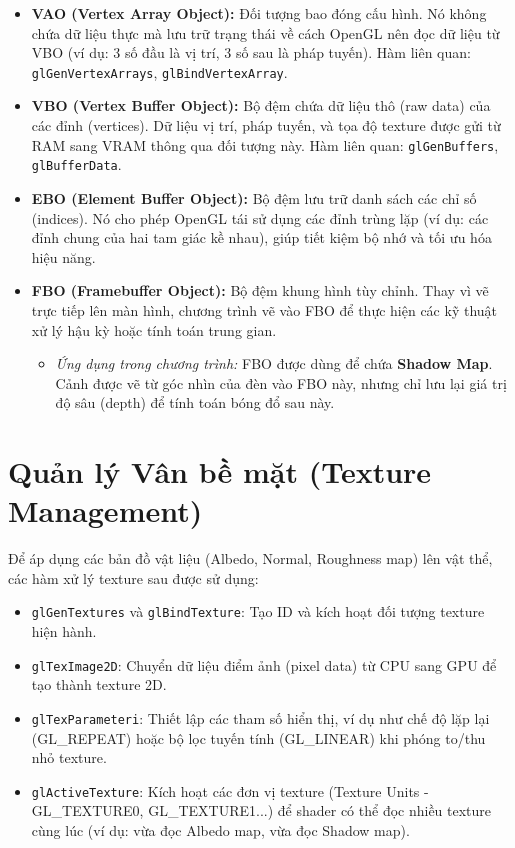 \begin{itemize}
	\item \textbf{VAO (Vertex Array Object):} Đối tượng bao đóng cấu hình. Nó không chứa dữ liệu thực mà lưu trữ trạng thái về cách OpenGL nên đọc dữ liệu từ VBO (ví dụ: 3 số đầu là vị trí, 3 số sau là pháp tuyến). Hàm liên quan: \texttt{glGenVertexArrays}, \texttt{glBindVertexArray}.
	\item \textbf{VBO (Vertex Buffer Object):} Bộ đệm chứa dữ liệu thô (raw data) của các đỉnh (vertices). Dữ liệu vị trí, pháp tuyến, và tọa độ texture được gửi từ RAM sang VRAM thông qua đối tượng này. Hàm liên quan: \texttt{glGenBuffers}, \texttt{glBufferData}.
	\item \textbf{EBO (Element Buffer Object):} Bộ đệm lưu trữ danh sách các chỉ số (indices). Nó cho phép OpenGL tái sử dụng các đỉnh trùng lặp (ví dụ: các đỉnh chung của hai tam giác kề nhau), giúp tiết kiệm bộ nhớ và tối ưu hóa hiệu năng.
	\item \textbf{FBO (Framebuffer Object):} Bộ đệm khung hình tùy chỉnh. Thay vì vẽ trực tiếp lên màn hình, chương trình vẽ vào FBO để thực hiện các kỹ thuật xử lý hậu kỳ hoặc tính toán trung gian.
	\begin{itemize}
		\item \textit{Ứng dụng trong chương trình:} FBO được dùng để chứa \textbf{Shadow Map}. Cảnh được vẽ từ góc nhìn của đèn vào FBO này, nhưng chỉ lưu lại giá trị độ sâu (depth) để tính toán bóng đổ sau này.
	\end{itemize}
\end{itemize}

\section{Quản lý Vân bề mặt (Texture Management)}

Để áp dụng các bản đồ vật liệu (Albedo, Normal, Roughness map) lên vật thể, các hàm xử lý texture sau được sử dụng:

\begin{itemize}
	\item \texttt{glGenTextures} và \texttt{glBindTexture}: Tạo ID và kích hoạt đối tượng texture hiện hành.
	\item \texttt{glTexImage2D}: Chuyển dữ liệu điểm ảnh (pixel data) từ CPU sang GPU để tạo thành texture 2D.
	\item \texttt{glTexParameteri}: Thiết lập các tham số hiển thị, ví dụ như chế độ lặp lại (GL\_REPEAT) hoặc bộ lọc tuyến tính (GL\_LINEAR) khi phóng to/thu nhỏ texture.
	\item \texttt{glActiveTexture}: Kích hoạt các đơn vị texture (Texture Units -\\ GL\_TEXTURE0, GL\_TEXTURE1...) để shader có thể đọc nhiều texture cùng lúc (ví dụ: vừa đọc Albedo map, vừa đọc Shadow map).
\end{itemize}

